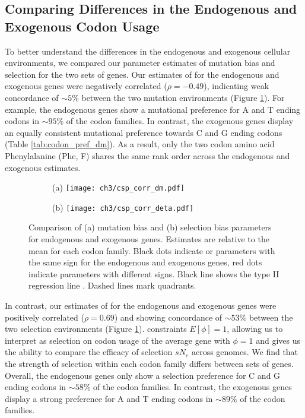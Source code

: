 \subsection{Comparing Differences in the Endogenous and Exogenous Codon Usage}
To better understand the differences in the endogenous and exogenous cellular environments, we compared our parameter estimates of mutation bias \DM and selection \DE for the two sets of genes.
Our estimates of \DM for the endogenous and exogenous genes were negatively correlated ($\rho = -0.49$),  indicating weak concordance of $\sim5\%$ between the two mutation environments (Figure \ref{fig:csp_comp}).
For example, the endogenous genes show a mutational preference for A and T ending codons in $\sim95\%$ of the codon families.
In contrast, the exogenous genes display an equally consistent mutational preference towards C and G ending codons (Table \ref{tab:codon_pref_dm}).
As a result, only the two codon amino acid Phenylalanine (Phe, F) shares the same rank order across the endogenous and exogenous \DM estimates.

\begin{figure}
    \centering
    \begin{subfigure}
        \centering
        (a) \texttt{[image: ch3/csp\_corr\_dm.pdf]}
    \end{subfigure}
    \begin{subfigure}
        \centering
        (b) \texttt{[image: ch3/csp\_corr\_deta.pdf]}
    \end{subfigure}
    \caption{Comparison of (a) mutation bias \DM and (b) selection bias \DE parameters for endogenous and exogenous genes.
      Estimates are relative to the mean for each codon family.
      Black dots indicate \DM or \DE parameters with the same sign for the endogenous and exogenous genes, red dots indicate parameters with different signs.
      Black line shows the type II regression line \citep{SokalAndRohlf1981}.
      Dashed lines mark quadrants.}
    \label{fig:csp_comp}
\end{figure}

In contrast, our estimates of \DE for the endogenous and exogenous genes were positively correlated ($\rho = 0.69$) and showing concordance of $\sim53\%$ between the two selection environments (Figure \ref{fig:csp_comp}).
\ROC constraints $E[\phi] = 1$, allowing us to interpret \DE as selection on codon usage of the average gene with $\phi = 1$ and gives us the ability to compare the efficacy of selection $sN_e$  across genomes.
We find that the strength of selection within each codon family differs between sets of genes.
Overall, the endogenous genes only show a selection preference for C and G ending codons in $\sim58\%$ of the codon families.
In contrast, the exogenous genes display a strong preference for A and T ending codons in $\sim89\%$ of the codon families.

